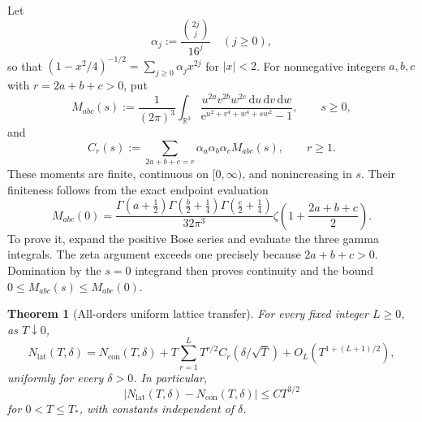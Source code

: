 \documentclass[11pt,a4paper]{article}
\numberwithin{equation}{section}
\newtheorem{theorem}{Theorem}[section]
\theoremstyle{definition}
\newcommand{\R}{\mathbb R}
\newcommand{\dd}{\,\mathrm d}
\newcommand{\con}{\mathrm{con}}
\newcommand{\latt}{\mathrm{lat}}
\newcommand{\e}{\mathrm e}
\begin{document}
Let
\begin{equation}
 \alpha_j:=\frac{\binom{2j}{j}}{16^j}\quad(j\ge0),
 \label{eq:alphaj}
\end{equation}
so that $(1-x^2/4)^{-1/2}=\sum_{j\ge0}\alpha_j x^{2j}$ for $|x|<2$.
For nonnegative integers $a,b,c$ with $r=2a+b+c>0$, put
\begin{equation}
 M_{abc}(s):=\frac1{(2\pi)^3}\int_{\R^3}
 \frac{u^{2a}v^{2b}w^{2c}\dd u\dd v\dd w}
 {\e^{u^2+v^4+w^4+s w^2}-1},\qquad s\ge0,
 \label{eq:moments}
\end{equation}
and
\begin{equation}
 C_r(s):=\sum_{2a+b+c=r}\alpha_a\alpha_b\alpha_c M_{abc}(s),
 \qquad r\ge1.
 \label{eq:Cr}
\end{equation}
These moments are finite, continuous on $[0,\infty)$, and nonincreasing
in $s$. Their finiteness follows from the exact endpoint evaluation
\begin{equation}
 M_{abc}(0)=\frac{\Gamma(a+\frac12)\Gamma(\frac b2+\frac14)
 \Gamma(\frac c2+\frac14)}{32\pi^3}
 \zeta\left(1+\frac{2a+b+c}{2}\right).
 \label{eq:momentendpoint}
\end{equation}
To prove it, expand the positive Bose series and evaluate the three
gamma integrals. The zeta argument exceeds one precisely because
$2a+b+c>0$. Domination by the $s=0$ integrand then proves continuity
and the bound $0\le M_{abc}(s)\le M_{abc}(0)$.

\begin{theorem}[All-orders uniform lattice transfer]
\label{thm:lattice}
For every fixed integer $L\ge0$, as $T\downarrow0$,
\begin{equation}
 N_{\latt}(T,\delta)=N_{\con}(T,\delta)
 +T\sum_{r=1}^{L}T^{r/2}C_r(\delta/\sqrt T)
 +O_L\left(T^{1+(L+1)/2}\right),
 \label{eq:latticetheorem}
\end{equation}
uniformly for every $\delta>0$. In particular,
\begin{equation}
 |N_{\latt}(T,\delta)-N_{\con}(T,\delta)|\le C T^{3/2}
 \label{eq:uniformerror}
\end{equation}
for $0<T\le T_*$, with constants independent of $\delta$.
\end{theorem}
\end{document}
